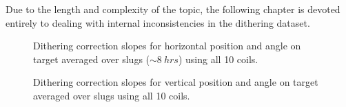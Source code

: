 Due to the length and complexity of the topic, the following chapter is devoted entirely to dealing with internal inconsistencies in the dithering dataset.

\begin{figure}[t]
\centering
{}
\caption{Dithering correction slopes for horizontal position and angle on target averaged over slugs ($\sim 8~hrs$) using all 10 coils.}
\label{fig:10Coil_bmod_X_slopes}
\end{figure}
\begin{figure}[ht]
\centering
{}
\caption{Dithering correction slopes for vertical position and angle on target averaged over slugs using all 10 coils.}
\label{fig:10Coil_bmod_Y_slopes}
\end{figure}
